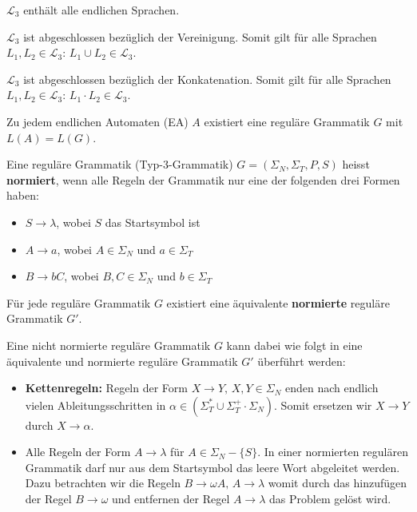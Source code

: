 \begin{lemma}
$\mathcal{L}_3$ enthält alle endlichen Sprachen.\\
\end{lemma}

\begin{lemma}
$\mathcal{L}_3$ ist abgeschlossen bezüglich der Vereinigung. Somit gilt für alle Sprachen $L_1, L_2 \in \mathcal{L}_3: \, L_1 \cup L_2 \in \mathcal{L}_3$.\\
\end{lemma}

\begin{lemma}
$\mathcal{L}_3$ ist abgeschlossen bezüglich der Konkatenation. Somit gilt für alle Sprachen $L_1, L_2 \in \mathcal{L}_3: \, L_1 \cdot L_2 \in \mathcal{L}_3$.\\
\end{lemma}

\begin{satz}
Zu jedem endlichen Automaten (EA) $A$ existiert eine reguläre Grammatik $G$ mit $L(A) = L(G)$.\\
\end{satz}

\begin{definition}
Eine reguläre Grammatik (Typ-3-Grammatik) $G = (\Sigma_N, \Sigma_T, P, S)$ heisst \textbf{normiert}, wenn alle Regeln der Grammatik nur eine der folgenden drei Formen haben:
\begin{itemize}
  \item $S \to \lambda$, wobei $S$ das Startsymbol ist
  \item $A \to a$, wobei $A \in \Sigma_N$ und $a \in \Sigma_T$
  \item $B \to bC$, wobei $B, C \in \Sigma_N$ und $b \in \Sigma_T$\\
\end{itemize}
\end{definition}

\begin{lemma}
Für jede reguläre Grammatik $G$ existiert eine äquivalente \textbf{normierte} reguläre Grammatik $G'$.\\
\end{lemma}

Eine nicht normierte reguläre Grammatik $G$ kann dabei wie folgt in eine äquivalente und normierte reguläre Grammatik $G'$ überführt werden:
\begin{itemize}
  \item \textbf{Kettenregeln:} Regeln der Form $X \to Y, \, X, Y \in \Sigma_N$ enden nach endlich vielen Ableitungsschritten in $\alpha \in (\Sigma_T^* \cup \Sigma_T^+ \cdot \Sigma_N)$. Somit ersetzen wir $X \to Y$ durch $X \to \alpha$.
  \item Alle Regeln der Form $A \to \lambda$ für $A \in \Sigma_N - \{S\}$. In einer normierten regulären Grammatik darf nur aus dem Startsymbol das leere Wort abgeleitet werden. Dazu betrachten wir die Regeln $B \to \omega A, \, A \to \lambda$ womit durch das hinzufügen der Regel $B \to \omega$ und entfernen der Regel $A \to \lambda$ das Problem gelöst wird.\\
\end{itemize}

